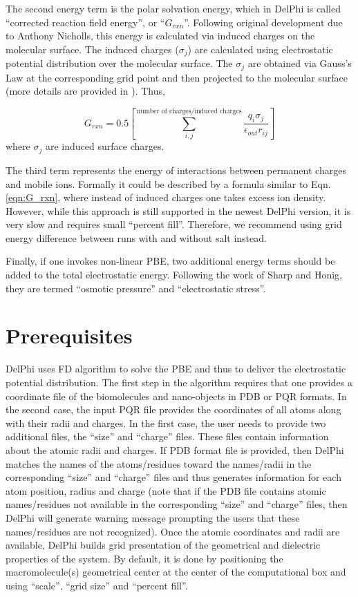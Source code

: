 \documentclass[9pt,tutorial,pubversion]{livecoms}
\begin{document}
The second energy term is the polar solvation energy, which in DelPhi is called ``corrected reaction field energy'', or ``$ G_{rxn} $''. Following original development due to Anthony Nicholls, this energy is calculated via induced charges on the molecular surface. The induced charges ($ \sigma_j $) are calculated using electrostatic potential distribution over the molecular surface. The $ \sigma_j $ are obtained via Gauss's Law at the corresponding grid point and then projected to the molecular surface (more details are provided in \cite{rocchia2001extending}). Thus, 

\begin{equation}\label{eqn:G_rxn}
    G_{rxn} = 0.5 \left[ \sum_{i, j}^{\text{number of charges/induced charges}}{\frac{q_i \sigma_j}{\epsilon_{out}r_{ij}}} \right]
\end{equation}
where $ \sigma_j $ are induced surface charges. 

The third term represents the energy of interactions between permanent charges and mobile ions. Formally it could be described by a formula similar to Eqn. \ref{eqn:G_rxn}, where instead of induced charges one takes excess ion density. However, while this approach is still supported in the newest DelPhi version, it is very slow and requires small “percent fill”. Therefore, we recommend using grid energy difference between runs with and without salt instead. 

Finally, if one invokes non-linear PBE, two additional energy terms should be added to the total electrostatic energy. Following the work of Sharp and Honig\cite{sharp1990electrostatic}, they are termed ``osmotic pressure'' and ``electrostatic stress''.


\section{Prerequisites}

DelPhi uses FD algorithm to solve the PBE and thus to deliver the electrostatic potential distribution. The first step in the algorithm requires that one provides a coordinate file of the biomolecules and nano-objects in PDB or PQR formats. In the second case, the input PQR file provides the coordinates of all atoms along with their radii and charges. In the first case, the user needs to provide two additional files, the ``size'' and ``charge'' files. These files contain information about the atomic radii and charges. If PDB format file is provided, then DelPhi matches the names of the atoms/residues toward the names/radii in the corresponding ``size'' and ``charge'' files and thus generates information for each atom position, radius and charge (note that if the PDB file contains atomic names/residues not available in the corresponding ``size'' and ``charge'' files, then DelPhi will generate warning message prompting the users that these names/residues are not recognized). Once the atomic coordinates and radii are available, DelPhi builds grid presentation of the geometrical and dielectric properties of the system. By default, it is done by positioning the macromolecule(s) geometrical center at the center of the computational box and using ``scale'', ``grid size'' and ``percent fill''. 
\end{document}
